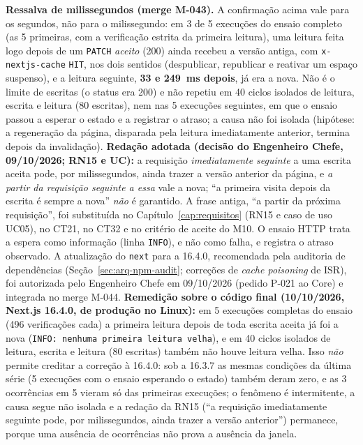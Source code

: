 \textbf{Ressalva de milissegundos (merge M-043).} A confirmação acima vale para os segundos, não para o milissegundo: em 3 de 5 execuções do ensaio completo (as 5 primeiras, com a verificação estrita da primeira leitura), uma leitura feita logo depois de um \texttt{PATCH} \emph{aceito} (200) ainda recebeu a versão antiga, com \texttt{x-nextjs-cache} \texttt{HIT}, nos dois sentidos (despublicar, republicar e reativar um espaço suspenso), e a leitura seguinte, \textbf{33 e 249~ms depois}, já era a nova. Não é o limite de escritas (o status era 200) e não repetiu em 40 ciclos isolados de leitura, escrita e leitura (80 escritas), nem nas 5 execuções seguintes, em que o ensaio passou a esperar o estado e a registrar o atraso; a causa não foi isolada (hipótese: a regeneração da página, disparada pela leitura imediatamente anterior, termina depois da invalidação). \textbf{Redação adotada (decisão do Engenheiro Chefe, 09/10/2026; RN15 e UC):} a requisição \emph{imediatamente seguinte} a uma escrita aceita pode, por milissegundos, ainda trazer a versão anterior da página, e \emph{a partir da requisição seguinte a essa} vale a nova; ``a primeira visita depois da escrita é sempre a nova'' \emph{não} é garantido. A frase antiga, ``a partir da próxima requisição'', foi substituída no Capítulo~\ref{cap:requisitos} (RN15 e caso de uso UC05), no CT21, no CT32 e no critério de aceite do M10. O ensaio HTTP trata a espera como informação (linha \texttt{INFO}), e não como falha, e registra o atraso observado. A atualização do \texttt{next} para a 16.4.0, recomendada pela auditoria de dependências (Seção~\ref{sec:arq-npm-audit}; correções de \emph{cache poisoning} de ISR), foi autorizada pelo Engenheiro Chefe em 09/10/2026 (pedido P-021 ao Core) e integrada no merge M-044. \textbf{Remedição sobre o código final (10/10/2026, Next.js 16.4.0,  de produção no Linux):} em 5 execuções completas do ensaio (496 verificações cada) a primeira leitura depois de toda escrita aceita já foi a nova (\texttt{INFO: nenhuma primeira leitura velha}), e em 40 ciclos isolados de leitura, escrita e leitura (80 escritas) também não houve leitura velha. Isso \emph{não} permite creditar a correção à 16.4.0: sob a 16.3.7 as mesmas condições da última série (5 execuções com o ensaio esperando o estado) também deram zero, e as 3 ocorrências em 5 vieram só das primeiras execuções; o fenômeno é intermitente, a causa segue não isolada e a redação da RN15 (``a requisição imediatamente seguinte pode, por milissegundos, ainda trazer a versão anterior'') permanece, porque uma ausência de ocorrências não prova a ausência da janela.

